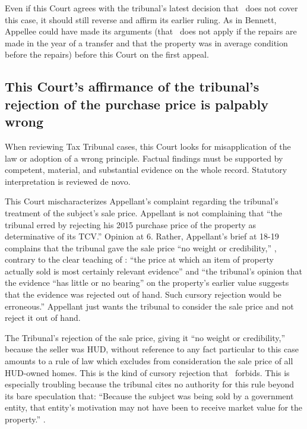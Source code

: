 \documentclass[12pt,\documentclassflag]{michiganCourtOfAppealsBrief}
\begin{document}
Even if this Court agrees with the tribunal's latest decision that \mathieuGast\ does not cover this case, it should still reverse and affirm its earlier ruling. As in Bennett, Appellee could have made its arguments (that \mathieuGast\ does not apply if the repairs are made in the year of a transfer and that the property was in average condition before the repairs) before this Court on the first appeal.

\subsection{This Court's affirmance of the tribunal's rejection of the purchase price is palpably wrong}

When reviewing Tax Tribunal cases, this Court looks for misapplication of the law or adoption of a wrong principle. Factual findings must be supported by competent, material, and substantial evidence on the whole record. Statutory interpretation is reviewed de novo. 

This Court mischaracterizes Appellant's complaint regarding the tribunal's treatment of the subject's sale price. Appellant is not complaining that ``the tribunal erred by rejecting his 2015 purchase price of the
property as determinative of its TCV.'' Opinion at 6. Rather, Appellant's brief at 18-19 complains that the tribunal gave the sale price ``no weight or credibility,'' \reconsiderationDenied[2], contrary to the clear teaching of : ``the price at which an item of
property actually sold is most certainly relevant evidence'' and ``the tribunal's opinion that the evidence ``has little or no
bearing'' on the property's earlier value suggests that the evidence was rejected out of hand. Such cursory rejection would be erroneous.''
Appellant just wants the tribunal to consider the sale price and not reject it out of hand.

The Tribunal's rejection of the sale price, giving it ``no weight or credibility,'' because the seller was HUD, without reference to any fact particular to this case amounts to a rule of law which excludes from consideration the sale price of all HUD-owned homes. This is the kind of cursory rejection that \cite[s]{Jones & Laughlin}\ forbids. This is especially troubling because the tribunal cites no authority for this rule beyond its bare speculation that: ``Because the subject was being sold by a government entity, that entity's motivation may
not have been to receive market value for the property.'' \reconsiderationDenied[2].
\end{document}

